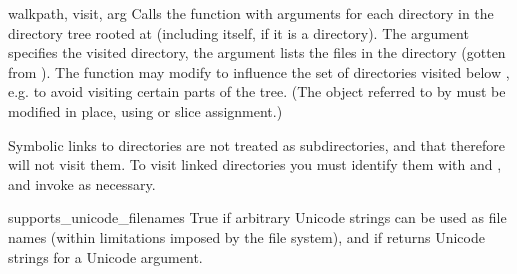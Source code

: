 \begin{funcdesc}{walk}{path, visit, arg}
Calls the function  with arguments
 for each directory in the
directory tree rooted at  (including  itself, if it
is a directory).  The argument  specifies the visited
directory, the argument  lists the files in the directory
(gotten from ).
The  function may modify  to
influence the set of directories visited below , e.g. to
avoid visiting certain parts of the tree.  (The object referred to by
 must be modified in place, using  or slice
assignment.)

\begin{notice}
Symbolic links to directories are not treated as subdirectories, and
that  therefore will not visit them. To visit linked
directories you must identify them with
 and
, and invoke  as
necessary.
\end{notice}

\end{funcdesc}

\begin{datadesc}{supports_unicode_filenames}
True if arbitrary Unicode strings can be used as file names (within
limitations imposed by the file system), and if
 returns Unicode strings for a Unicode
argument.
\end{datadesc}
